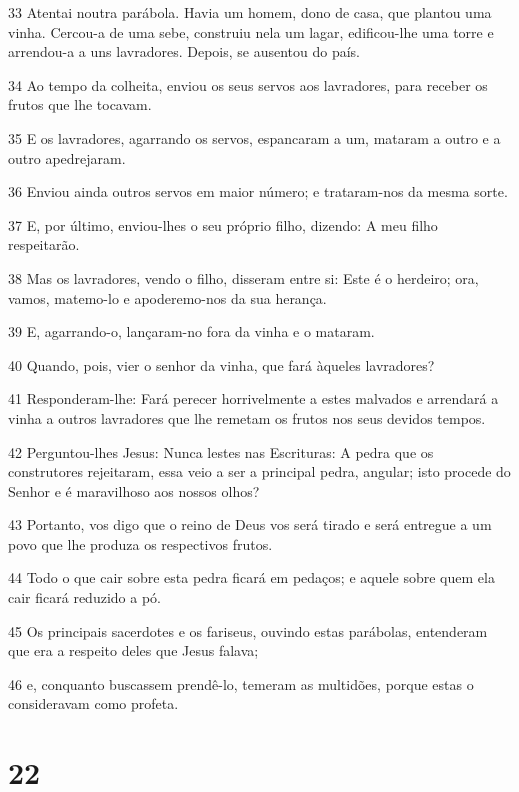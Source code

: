 \par 33 Atentai noutra parábola. Havia um homem, dono de casa, que plantou uma vinha. Cercou-a de uma sebe, construiu nela um lagar, edificou-lhe uma torre e arrendou-a a uns lavradores. Depois, se ausentou do país.
\par 34 Ao tempo da colheita, enviou os seus servos aos lavradores, para receber os frutos que lhe tocavam.
\par 35 E os lavradores, agarrando os servos, espancaram a um, mataram a outro e a outro apedrejaram.
\par 36 Enviou ainda outros servos em maior número; e trataram-nos da mesma sorte.
\par 37 E, por último, enviou-lhes o seu próprio filho, dizendo: A meu filho respeitarão.
\par 38 Mas os lavradores, vendo o filho, disseram entre si: Este é o herdeiro; ora, vamos, matemo-lo e apoderemo-nos da sua herança.
\par 39 E, agarrando-o, lançaram-no fora da vinha e o mataram.
\par 40 Quando, pois, vier o senhor da vinha, que fará àqueles lavradores?
\par 41 Responderam-lhe: Fará perecer horrivelmente a estes malvados e arrendará a vinha a outros lavradores que lhe remetam os frutos nos seus devidos tempos.
\par 42 Perguntou-lhes Jesus: Nunca lestes nas Escrituras: A pedra que os construtores rejeitaram, essa veio a ser a principal pedra, angular; isto procede do Senhor e é maravilhoso aos nossos olhos?
\par 43 Portanto, vos digo que o reino de Deus vos será tirado e será entregue a um povo que lhe produza os respectivos frutos.
\par 44 Todo o que cair sobre esta pedra ficará em pedaços; e aquele sobre quem ela cair ficará reduzido a pó.
\par 45 Os principais sacerdotes e os fariseus, ouvindo estas parábolas, entenderam que era a respeito deles que Jesus falava;
\par 46 e, conquanto buscassem prendê-lo, temeram as multidões, porque estas o consideravam como profeta.

\chapter{22}

